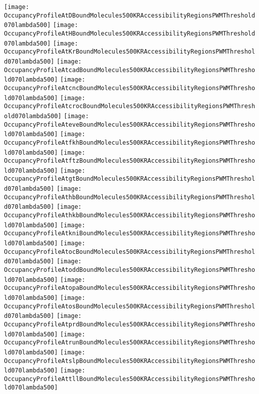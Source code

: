 \documentclass[11pt]{article}
\begin{document}
 


\begin{center}
\texttt{[image: OccupancyProfileAtDBoundMolecules500KRAccessibilityRegionsPWMThreshold070lambda500]}
\texttt{[image: OccupancyProfileAtHBoundMolecules500KRAccessibilityRegionsPWMThreshold070lambda500]}
\texttt{[image: OccupancyProfileAtKrBoundMolecules500KRAccessibilityRegionsPWMThreshold070lambda500]}
\texttt{[image: OccupancyProfileAtcadBoundMolecules500KRAccessibilityRegionsPWMThreshold070lambda500]}
\texttt{[image: OccupancyProfileAtcncBoundMolecules500KRAccessibilityRegionsPWMThreshold070lambda500]}
\texttt{[image: OccupancyProfileAtcrocBoundMolecules500KRAccessibilityRegionsPWMThreshold070lambda500]}
\texttt{[image: OccupancyProfileAteveBoundMolecules500KRAccessibilityRegionsPWMThreshold070lambda500]}
\texttt{[image: OccupancyProfileAtfkhBoundMolecules500KRAccessibilityRegionsPWMThreshold070lambda500]}
\texttt{[image: OccupancyProfileAtftzBoundMolecules500KRAccessibilityRegionsPWMThreshold070lambda500]}
\texttt{[image: OccupancyProfileAtgtBoundMolecules500KRAccessibilityRegionsPWMThreshold070lambda500]}
\texttt{[image: OccupancyProfileAthbBoundMolecules500KRAccessibilityRegionsPWMThreshold070lambda500]}
\texttt{[image: OccupancyProfileAthkbBoundMolecules500KRAccessibilityRegionsPWMThreshold070lambda500]}
\texttt{[image: OccupancyProfileAtkniBoundMolecules500KRAccessibilityRegionsPWMThreshold070lambda500]}
\texttt{[image: OccupancyProfileAtocBoundMolecules500KRAccessibilityRegionsPWMThreshold070lambda500]}
\texttt{[image: OccupancyProfileAtoddBoundMolecules500KRAccessibilityRegionsPWMThreshold070lambda500]}
\texttt{[image: OccupancyProfileAtopaBoundMolecules500KRAccessibilityRegionsPWMThreshold070lambda500]}
\texttt{[image: OccupancyProfileAtosBoundMolecules500KRAccessibilityRegionsPWMThreshold070lambda500]}
\texttt{[image: OccupancyProfileAtprdBoundMolecules500KRAccessibilityRegionsPWMThreshold070lambda500]}
\texttt{[image: OccupancyProfileAtrunBoundMolecules500KRAccessibilityRegionsPWMThreshold070lambda500]}
\texttt{[image: OccupancyProfileAtslpBoundMolecules500KRAccessibilityRegionsPWMThreshold070lambda500]}
\texttt{[image: OccupancyProfileAttllBoundMolecules500KRAccessibilityRegionsPWMThreshold070lambda500]}
\end{center}


\end{document}
